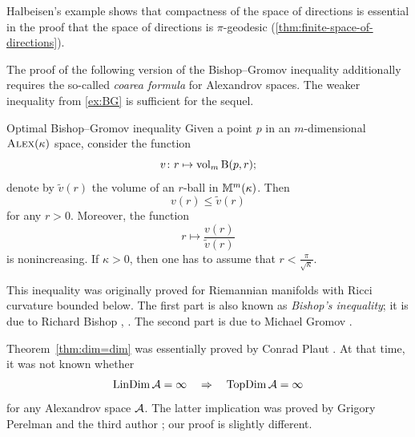 Halbeisen's example \cite{alexander-kapovitch-petrunin2024,halbeisen} shows that compactness of the space of directions is essential in the proof that the space of directions is $\pi$-geodesic (\ref{thm:finite-space-of-directions}).

The proof of the following version of the Bishop--Gromov inequality additionally requires the so-called \textit{coarea formula} for Alexandrov spaces.
The weaker inequality from \ref{ex:BG} is sufficient for the sequel.

\begin{thm}{Optimal Bishop--Gromov inequality}\label{inq:BG+}
Given a point $p$ in an $m$-dimensional $\textup{\textsc{Alex}}(\kappa)$ space,
consider the function
\[v\colon r\mapsto\operatorname{\rm vol}\nolimits_m\mathrm{B}{}(p,r);\]
denote by $\tilde v(r)$ the volume of an $r$-ball in $\mathbb{M}^m(\kappa)$.
Then
\[v(r)\le \tilde v(r)\]
for any $r>0$.
Moreover, the function
\[r\mapsto \frac{v(r)}{\tilde v(r)}\] is nonincreasing.
If $\kappa>0$, then one has to assume that $r<\tfrac\pi{\sqrt\kappa}$.
\end{thm}

This inequality was originally proved for Riemannian manifolds with Ricci curvature bounded below.
The first part is also known as \emph{Bishop's inequality}; it is due to Richard Bishop \cite{bishop1964}, \cite[Corollary 4, p. 256]{bishop-crittenden}.
The second part is due to Michael Gromov \cite{gromov1981}.

Theorem~\ref{thm:dim=dim} was essentially proved by Conrad Plaut \cite{plaut:dimension}.
At that time, it was not known whether
\[\mathop{\rm LinDim}\nolimits\mathcal{A}=\infty\quad \Rightarrow\quad \mathop{\rm TopDim}\nolimits\mathcal{A}=\infty\]
for any Alexandrov space $\mathcal{A}$.
The latter implication was proved by Grigory Perelman and the third author \cite{perelman-petrunin:qg}; our proof is slightly different.
